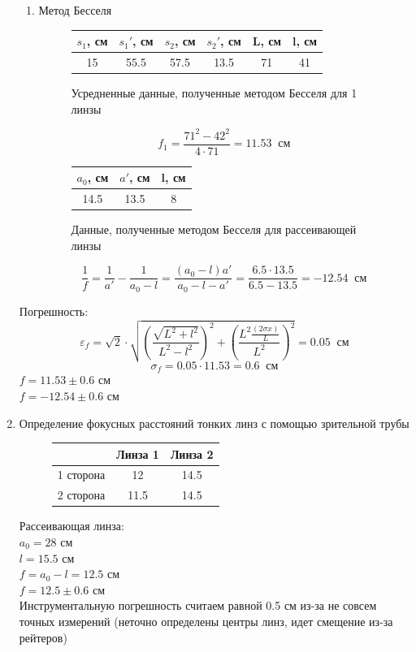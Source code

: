 \documentclass[a4paper,12pt]{article}
\begin{document}
\begin{enumerate}
\begin{enumerate}
\item Метод Бесселя
\begin{figure}[h!]
\centering\begin{tabular}{|c|c|c|c|c|c|}
\hline 
$s_1$, см & $s_1'$, см & $s_2$, см & $s_2'$, см & L, см & l, см \\ 
\hline 
15 & 55.5 & 57.5 & 13.5 & 71 & 41 \\ 
\hline 
\end{tabular} 
\caption{Усредненные данные, полученные методом Бесселя для 1 линзы}
\end{figure}
\[f_1 = \dfrac{71^2-42^2}{4\cdot 71} = 11.53\;\;\text{см}\]
\begin{figure}[h!]
\centering
\begin{tabular}{|c|c|c|}
\hline 
$a_0$, см & $a'$, см & l, см \\ 
\hline 
14.5 & 13.5 & 8 \\ 
\hline
\end{tabular} 
\caption{Данные, полученные методом Бесселя для рассеивающей линзы}
\end{figure}
\[\frac{1}{f}=\frac{1}{a'}-\frac{1}{a_0-l} = \frac{(a_0-l)a'}{a_0-l-a'} = \frac{6.5 \cdot 13.5}{6.5 - 13.5} = -12.54\;\;\text{см}\]
\end{enumerate}
Погрешность:\\
\[\varepsilon_f=\sqrt{2}\cdot\sqrt{(\frac{\sqrt{L^2 + l^2}}{L^2 - l^2})^2+(\frac{L^2\frac{(2\sigma x)}{L}}{L^2})^2} = 0.05\;\;\text{см}\]
\[\sigma_f= 0.05\cdot 11.53 = 0.6\;\;\text{см}\]
$f = 11.53 \pm 0.6$ см \\
$f = -12.54 \pm 0.6$ см \\
\item Определение фокусных расстояний тонких линз с помощью зрительной трубы
\begin{figure}[h!]
\centering
\begin{tabular}{|c|c|c|}
\hline 
 & Линза 1 & Линза 2 \\ 
\hline 
1 сторона & 12 & 14.5 \\ 
\hline 
2 сторона & 11.5 & 14.5 \\ 
\hline 
\end{tabular} 
\end{figure}
Рассеивающая линза:\\
$a_0 = 28$ см\\
$l = 15.5$ см\\
$f = a_0-l = 12.5$ см\\ 
$f = 12.5 \pm 0.6$ см\\
Инструментальную погрешность считаем равной 0.5 см из-за не совсем точных измерений (неточно определены центры линз, идет смещение из-за рейтеров)


\end{enumerate}
\end{document}
